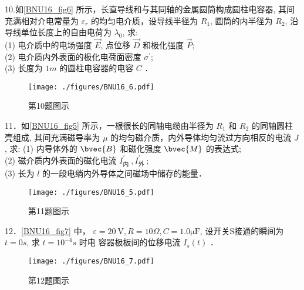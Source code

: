 10.如\autoref{BNU16_fig6} 所示，长直导线和与其同轴的金属圆筒构成圆柱电容器, 其间充满相对介电常量为 $\varepsilon_{r}$ 的均匀电介质，设导线半径为 $R_{1}$, 圆筒的内半径为 $R_{2}$, 沿导线单位长度上的自由电荷为 $\lambda_{0}$, 求:\\
(1) 电介质中的电场强度 $\vec{E}$, 点位移 $\vec{D}$ 和极化强度 $\vec{P}$;\\
(2) 电介质内外表面的极化电荷面密度 $\sigma^{\prime}$;\\
(3) 长度为 $1 m$ 的圆柱电容器的电容 $C$ ．
\begin{figure}[ht]
\centering
\texttt{[image: ./figures/BNU16\_6.pdf]}
\caption{第10题图示} \label{BNU16_fig6}
\end{figure}

11．如\autoref{BNU16_fig5} 所示，一根很长的同轴电缆由半径为 $R_{1}$ 和 $R_{2}$ 的同轴圆柱壳组成, 其间充满磁导率为 $\mu$ 的均匀磁介质，内外导体均匀流过方向相反的电流 $J$, 求:
(1) 内导体外的 $\bvec{B}$ 和磁化强度 $\bvec{M}$ 的表达式;\\
(2) 磁介质内外表面的磁化电流 $I_{\text {内 }}^{\prime}, I_{\text {外 }}^{\prime}$;\\
(3) 长为 $l$ 的一段电绱内外导体之间磁场中储存的能量．
\begin{figure}[ht]
\centering
\texttt{[image: ./figures/BNU16\_5.pdf]}
\caption{第11题图示} \label{BNU16_fig5}
\end{figure}
12．\autoref{BNU16_fig7} 中， $\varepsilon=20 \mathrm{~V}, R=10 \Omega, C=1.0\mathrm{\mu F}$, 设开关S接通的瞬间为 $t=0 s$, 求 $t=10^{-4} s$ 时电 容器极板间的位移电流 $I_{s}(t)$ ．
\begin{figure}[ht]
\centering
\texttt{[image: ./figures/BNU16\_7.pdf]}
\caption{第12题图示} \label{BNU16_fig7}
\end{figure}